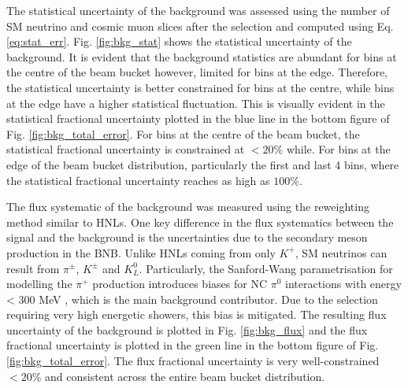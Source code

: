 The statistical uncertainty of the background was assessed using the number of SM neutrino and cosmic muon slices after the selection and computed using Eq. \ref{eq:stat_err}.
Fig. \ref{fig:bkg_stat} shows the statistical uncertainty of the background.
It is evident that the background statistics are abundant for bins at the centre of the beam bucket however, limited for bins at the edge.
Therefore, the statistical uncertainty is better constrained for bins at the centre, while bins at the edge have 
a higher statistical fluctuation.
This is visually evident in the statistical fractional uncertainty plotted in the blue line in the bottom figure of Fig. \ref{fig:bkg_total_error}.                                                                               
For bins at the centre of the beam bucket, the statistical fractional uncertainty is constrained at $< 20\%$ while.
For bins at the edge of the beam bucket distribution, particularly the first and last 4 bins, where the statistical fractional uncertainty reaches as high as $100\%$.

The flux systematic of the background was measured using the reweighting method similar to HNLs.              
One key difference in the flux systematics between the signal and the background is the uncertainties due to the secondary meson production in the BNB.                                                                           
Unlike HNLs coming from only $K^+$, SM neutrinos can result from $\pi^\pm$, $K^\pm$ and $K^0_L$.%
Particularly, the Sanford-Wang parametrisation for modelling the $\pi^+$ production introduces biases for NC $\pi^0$ interactions with energy < 300 MeV \cite{EdPhD}, which is the main background contributor.
Due to the selection requiring very high energetic showers, this bias is mitigated.
The resulting flux uncertainty of the background is plotted in Fig. \ref{fig:bkg_flux} and the flux fractional uncertainty is plotted in the green line in the bottom figure of Fig. \ref{fig:bkg_total_error}.
The flux fractional uncertainty is very well-constrained $<20 \%$ and consistent across the entire beam bucket distribution.

